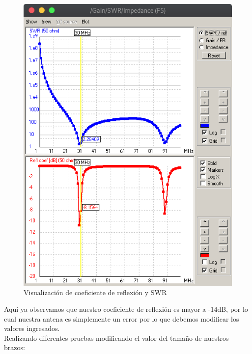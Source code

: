 \documentclass[11pt,a4paper]{article}
\begin{document}
    \begin{figure}[H]
    \centering
    \includegraphics[scale=0.4]{images/dipolo/dipoloswr.png}
    \caption{Visualizaci\'on de coeficiente de reflexi\'on y SWR}
    \label{fig3:yagui2d}
    \end{figure}
    
Aqui ya observamos que nuestro coeficiente de reflexi\'on es mayor a -14dB, por lo cual nuestra antena es simplemente un error por lo que debemos modificar los valores ingresados.\\
Realizando diferentes pruebas modificando el valor del tamaño de nuestros brazos:
\end{document}
